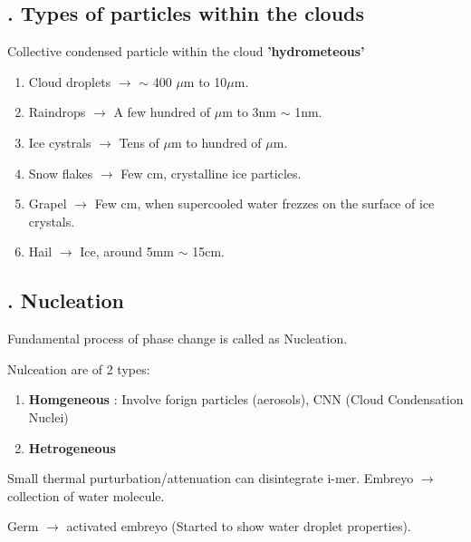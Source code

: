 \documentclass[fleqn,10pt]{SelfArx} %
\begin{document}
\subsection{. Types of particles within the clouds}
Collective condensed particle within the cloud \textbf{'hydrometeous'}
\begin{enumerate}[noitemsep]
    \item Cloud droplets $\rightarrow$ $\sim$ 400 $\mu$m to 10$\mu$m.
    \item Raindrops $\rightarrow$ A few hundred of $\mu$m to 3nm $\sim$ 1nm.
    \item Ice cystrals $\rightarrow$ Tens of $\mu$m to hundred of $\mu$m.
    \item Snow flakes $\rightarrow$ Few cm, crystalline ice particles.
    \item Grapel $\rightarrow$ Few cm, when supercooled water frezzes on the surface of ice crystals.
    \item Hail $\rightarrow$ Ice, around 5mm $\sim$ 15cm.
\end{enumerate}

\subsection{. Nucleation}
Fundamental process of phase change is called as Nucleation.

Nulceation are of 2 types:
\begin{enumerate}[noitemsep]
    \item \textbf{Homgeneous} : Involve forign particles (aerosols), CNN (Cloud Condensation Nuclei)
    \item \textbf{Hetrogeneous}
\end{enumerate}
Small thermal purturbation/attenuation can disintegrate i-mer.
Embreyo $\rightarrow$ collection of water molecule.

Germ $\rightarrow$ activated embreyo (Started to show water droplet properties).

\end{document}
